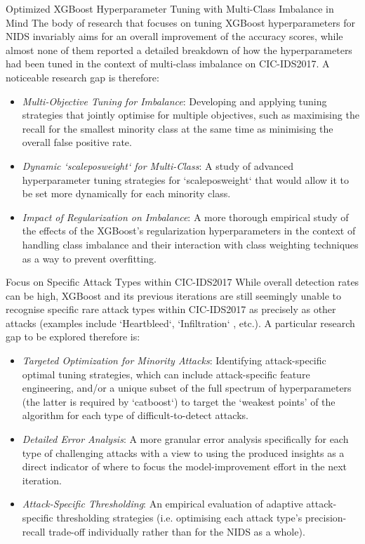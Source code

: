 Optimized XGBoost Hyperparameter Tuning with Multi-Class Imbalance in Mind
The body of research that focuses on tuning XGBoost hyperparameters for NIDS invariably aims for an overall improvement of the accuracy scores, while almost none of them reported a detailed breakdown of how the hyperparameters had been tuned in the context of multi-class imbalance on CIC-IDS2017. A noticeable research gap is therefore: 
\begin{itemize}[noitemsep] 
\item \textit{Multi-Objective Tuning for Imbalance}: Developing and applying tuning strategies that jointly optimise for multiple objectives, such as maximising the recall for the smallest minority class at the same time as minimising the overall false positive rate.
\item \textit{Dynamic `scale\textunderscore pos\textunderscore weight` for Multi-Class}: A study of advanced hyperparameter tuning strategies for `scale\textunderscore pos\textunderscore weight` that would allow it to be set more dynamically for each minority class.
\item \textit{Impact of Regularization on Imbalance}: A more thorough empirical study of the effects of the XGBoost's regularization hyperparameters in the context of handling class imbalance and their interaction with class weighting techniques as a way to prevent overfitting.
\end{itemize} 

Focus on Specific Attack Types within CIC-IDS2017 
While overall detection rates can be high, XGBoost and its previous iterations are still seemingly unable to recognise specific rare attack types within CIC-IDS2017 as precisely as other attacks (examples include `Heartbleed`, `Infiltration` \parencite{kumar2021cicids, al2022cicids}, etc.). A particular research gap to be explored therefore is:
\begin{itemize}[noitemsep] 
\item \textit{Targeted Optimization for Minority Attacks}: Identifying attack-specific optimal tuning strategies, which can include attack-specific feature engineering, and/or a unique subset of the full spectrum of hyperparameters (the latter is required by `catboost`) to target the ‘weakest points' of the algorithm for each type of difficult-to-detect attacks.
\item \textit{Detailed Error Analysis}: A more granular error analysis specifically for each type of challenging attacks with a view to using the produced insights as a direct indicator of where to focus the model-improvement effort in the next iteration.
\item \textit{Attack-Specific Thresholding}: An empirical evaluation of adaptive attack-specific thresholding strategies (i.e. optimising each attack type's precision-recall trade-off individually rather than for the NIDS as a whole).
\end{itemize} 

